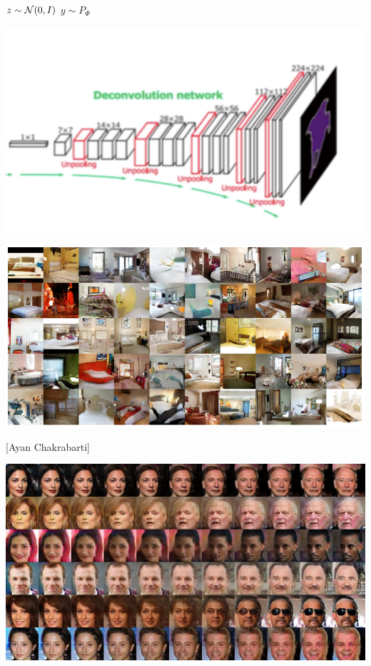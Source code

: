 {
\centerline{$z\sim {\cal N}(0,I)$ \hspace{7em} $y\sim P_\Phi$}
\centerline{\includegraphics[width=6in]{../images/halfdeconv}}


\centerline{\includegraphics[width = 10in]{../images/Bedrooms}}


[Ayan Chakrabarti]

\centerline{\includegraphics[width = 9in]{../images/interp}}

}
